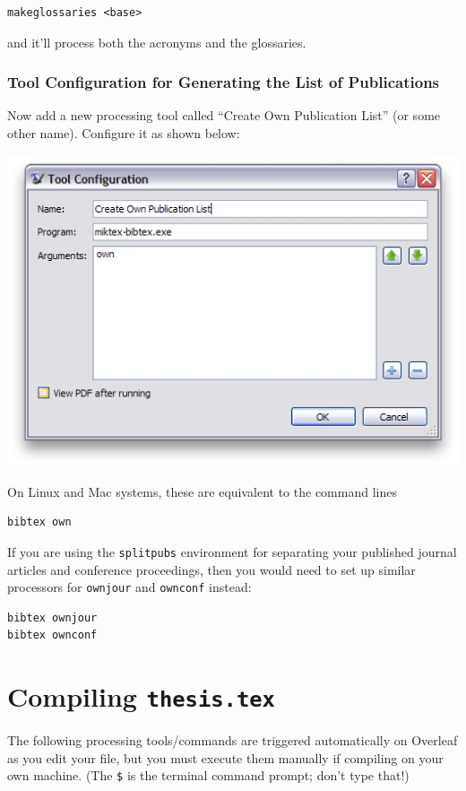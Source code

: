 \begin{lstlisting}
makeglossaries <base>
\end{lstlisting}

\noindent and it'll process both the acronyms and the glossaries.

\subsubsection{Tool Configuration for Generating the List of Publications}
Now add a new processing tool called ``\textsf{Create Own Publication List}'' (or some other name). Configure it as shown below:

\includegraphics[width=.9\textwidth]{texworks-win_ownpub}


On Linux and Mac systems, these are equivalent to the command lines

\begin{lstlisting}
bibtex own
\end{lstlisting}

If you are using the \texttt{splitpubs} environment for separating your published journal articles and conference proceedings, then you would need to set up similar processors for \texttt{ownjour} and \texttt{ownconf} instead:

\begin{lstlisting}
bibtex ownjour
bibtex ownconf
\end{lstlisting}


\section{Compiling \texttt{thesis.tex}}

The following processing tools/commands are triggered automatically on Overleaf as you edit your file, but you must execute them manually if compiling on your own machine. (The \verb|$| is the terminal command prompt; don't type that!)

